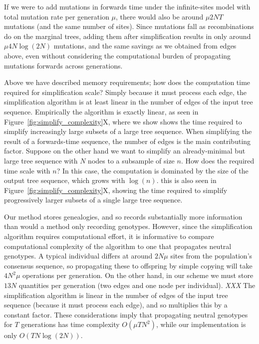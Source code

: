 \documentclass{article}
\newcommand{\plr}[1]{{\em \color{blue} #1}}
\begin{document}
If we were to add mutations in forwards time
under the infinite-sites model with total mutation rate per generation $\mu$,
there would also be around $\mu 2NT$ mutations (and the same number of sites).
Since mutations fall as recombinations do on the marginal trees,
adding them after simplification results in only around $\mu 4 N \log(2N)$ mutations,
and the same savings as we obtained from edges above,
even without considering the
computational burden of propagating mutations forwards across generations.


Above we have described memory requirements;
how does the computation time required for simplification scale?
Simply because it must process each edge,
the simplification algorithm is at least linear in the number of edges of the input tree sequence.
Empirically the algorithm is exactly linear,
as seen in Figure~\ref{fig:simplify_complexity}X,
where we show shows the time required to simplify increasingly large subsets of a large tree sequence.
When simplifying the result of a forwards-time sequence, the number of edges is the main contributing factor.
Suppose on the other hand we want to
simplify an already-minimal but large tree sequence with $N$ nodes
to a subsample of size $n$.
How does the required time scale with $n$?
In this case, the computation is dominated by the size of the output tree sequence,
which grows with $\log(n)$.
this is also seen in Figure~\ref{fig:simplify_complexity}X,
showing the time required to simplify progressively larger subsets of a single large tree sequence.


Our method stores genealogies, and so records substantially more information
than would a method only recording genotypes.
However, since the simplification algorithm requires computational effort,
it is informative to compare computational complexity of the algorithm
to one that propagates neutral genotypes.
A typical individual differs at around $2 N \mu$ sites from the population's consensus sequence,
so propagating these to offspring by simple copying will take $4 N^2 \mu$ operations per generation.
On the other hand,
in our scheme we must store $13N$ quantities per generation (two edges and one node per individual).
\plr{XXX}
The simplification algorithm is linear in the number of edges of the input tree sequence
(because it must process each edge),
and so multiplies this by a constant factor.
These considerations imply that propagating neutral genotypes for $T$ generations has time complexity $O(\mu T N^2)$,
while our implementation is only $O(T N \log(2N))$.
\end{document}
